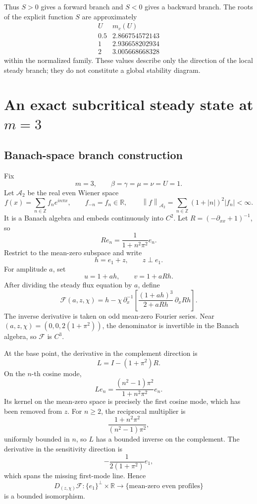 \documentclass[11pt]{article}
\newcommand{\R}{\mathbb{R}}
\newcommand{\norm}[1]{\left\lVert #1\right\rVert}
\newcommand{\abs}[1]{\left\lvert #1\right\rvert}
\begin{document}
Thus \(S>0\) gives a forward branch and \(S<0\) gives a backward branch.
The roots of the explicit function \(S\) are approximately
\[
\begin{array}{c|c}
U&m_c(U)\\ \hline
0.5&2.866754572143\\
1&2.936658202934\\
2&3.005668668328
\end{array}
\]
within the normalized family.  These values describe only the direction of
the local steady branch; they do not constitute a global stability diagram.

\section{An exact subcritical steady state at \(m=3\)}

\subsection{Banach-space branch construction}

Fix
\[
 m=3,\qquad \beta=\gamma=\mu=\nu=U=1.
\]
Let \(\mathcal A_2\) be the real even Wiener space
\[
 f(x)=\sum_{n\in\mathbb Z}f_ne^{in\pi x},\qquad
 f_{-n}=f_n\in\R,\qquad
 \norm f_{\mathcal A_2}
 =\sum_{n\in\mathbb Z}(1+\abs n)^2\abs{f_n}<\infty.
\]
It is a Banach algebra and embeds continuously into \(C^2\).
Let \(R=(-\partial_{xx}+1)^{-1}\), so
\[
 R e_n=\frac1{1+n^2\pi^2}e_n.
\]
Restrict to the mean-zero subspace and write
\[
 h=e_1+z,\qquad z\perp e_1.
\]
For amplitude \(a\), set
\[
 u=1+ah,\qquad v=1+aRh.
\]
After dividing the steady flux equation by \(a\), define
\begin{equation}
 \mathcal F(a,z,\chi)=
 h-\chi\,\partial_x^{-1}
 \left[\frac{(1+ah)^3}{2+aRh}\,\partial_xRh\right].
                                                               \label{eq:F}
\end{equation}
The inverse derivative is taken on odd mean-zero Fourier series.  Near
\((a,z,\chi)=(0,0,2(1+\pi^2))\), the denominator is invertible in the
Banach algebra, so \(\mathcal F\) is \(C^3\).

At the base point, the derivative in the complement direction is
\[
 L=I-(1+\pi^2)R.
\]
On the \(n\)-th cosine mode,
\begin{equation}
 Le_n=
 \frac{(n^2-1)\pi^2}{1+n^2\pi^2}e_n.                  \label{eq:Lmode}
\end{equation}
Its kernel on the mean-zero space is precisely the first cosine mode, which
has been removed from \(z\).  For \(n\ge2\), the reciprocal multiplier is
\[
 \frac{1+n^2\pi^2}{(n^2-1)\pi^2},
\]
uniformly bounded in \(n\), so \(L\) has a bounded inverse on the complement.
The derivative in the sensitivity direction is
\[
 -\frac1{2(1+\pi^2)}e_1,
\]
which spans the missing first-mode line.  Hence
\[
 D_{(z,\chi)}\mathcal F
 \colon \{e_1\}^{\perp}\times\R
 \longrightarrow \{\text{mean-zero even profiles}\}
\]
is a bounded isomorphism.
\end{document}

